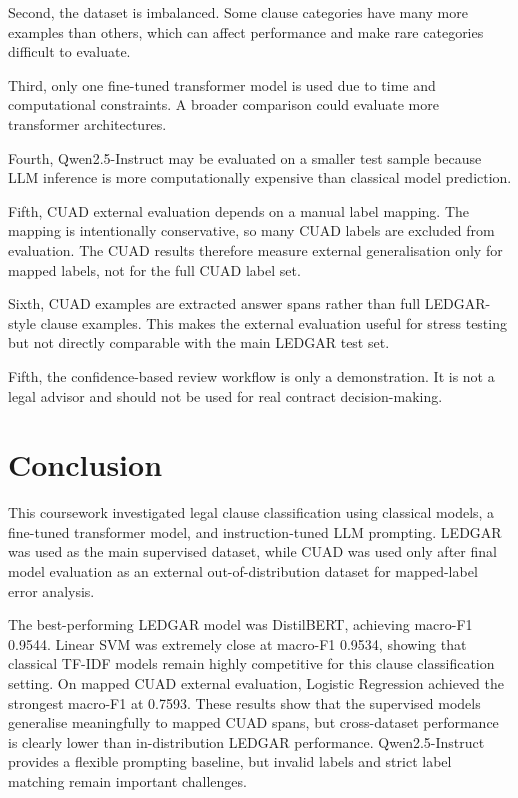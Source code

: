 \documentclass[11pt]{article}
\begin{document}
Second, the dataset is imbalanced. Some clause categories have many more examples than others, which can affect performance and make rare categories difficult to evaluate.

Third, only one fine-tuned transformer model is used due to time and computational constraints. A broader comparison could evaluate more transformer architectures.

Fourth, Qwen2.5-Instruct may be evaluated on a smaller test sample because LLM inference is more computationally expensive than classical model prediction.

Fifth, CUAD external evaluation depends on a manual label mapping. The mapping is intentionally conservative, so many CUAD labels are excluded from evaluation. The CUAD results therefore measure external generalisation only for mapped labels, not for the full CUAD label set.

Sixth, CUAD examples are extracted answer spans rather than full LEDGAR-style clause examples. This makes the external evaluation useful for stress testing but not directly comparable with the main LEDGAR test set.

Fifth, the confidence-based review workflow is only a demonstration. It is not a legal advisor and should not be used for real contract decision-making.

\section{Conclusion}

This coursework investigated legal clause classification using classical models, a fine-tuned transformer model, and instruction-tuned LLM prompting. LEDGAR was used as the main supervised dataset, while CUAD was used only after final model evaluation as an external out-of-distribution dataset for mapped-label error analysis.

The best-performing LEDGAR model was DistilBERT, achieving macro-F1 0.9544. Linear SVM was extremely close at macro-F1 0.9534, showing that classical TF-IDF models remain highly competitive for this clause classification setting. On mapped CUAD external evaluation, Logistic Regression achieved the strongest macro-F1 at 0.7593. These results show that the supervised models generalise meaningfully to mapped CUAD spans, but cross-dataset performance is clearly lower than in-distribution LEDGAR performance. Qwen2.5-Instruct provides a flexible prompting baseline, but invalid labels and strict label matching remain important challenges.
\end{document}
